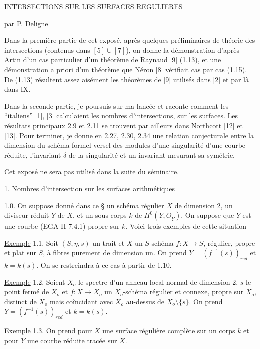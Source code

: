 


\underline{\underline{INTERSECTIONS SUR LES SURFACES REGULIERES}}


\underline{par P. Deligne}

Dans la première partie de cet exposé, après quelques préliminaires de théorie des intersections (contenus dans $[5] \cup [7]$), on donne la démonstration d'après Artin d'un cas particulier d'un théorème de Raynaud [9] (1.13), et une démonstration a priori d'un théorème que Néron [8] vérifiait cas par cas (1.15). De (1.13) résultent assez aisément les théorèmes de [9] utilisés dans [2] et par là dans IX.

Dans la seconde partie, je poursuis sur ma lancée et raconte comment les ``italiens'' [1], [3] calculaient les nombres d'intersections, sur les surfaces. Les résultats principaux 2.9 et 2.11 se trouvent par ailleurs dans Northcott [12] et [13]. Pour terminer, je donne en 2.27, 2.30, 2.34 une relation conjecturale entre la dimension du schéma formel versel des modules d'une singularité d'une courbe réduite, l'invariant $\delta$ de la singularité et un invariant mesurant sa symétrie.

Cet exposé ne sera pas utilisé dans la suite du séminaire.


1. \underline{Nombres d'intersection sur les surfaces arithmétiques}

1.0. On suppose donné dans ce \S{} un schéma régulier $X$ de dimension 2, un diviseur réduit $Y$ de $X$, et un sous-corps $k$ de $H^0(Y,\underline{O}_Y)$. On suppose que $Y$ est une courbe (EGA II 7.4.1) propre sur $k$. Voici trois exemples de cette situation

\underline{Exemple} 1.1. Soit $(S,\eta,s)$ un trait et $X$ un $S$-schéma $f : X \longrightarrow S$, régulier, propre et plat sur $S$, à fibres purement de dimension un. On prend $Y = (f^{-1}(s))_{red}$ et $k = k(s)$. On se restreindra à ce cas à partir de 1.10.



\underline{Exemple} 1.2. Soient $X_o$ le spectre d'un anneau local normal de dimension 2, $s$ le point fermé de $X_o$ et $f : X \longrightarrow X_o$ un $X_o$-schéma régulier et connexe, propre sur $X_o$, distinct de $X_o$ mais coîncidant avec $X_o$ au-dessus de $X_o \setminus \{s\}$. On prend $Y = (f^{-1}(s))_{red}$ et $k = k(s)$.

\underline{Exemple} 1.3. On prend pour $X$ une surface régulière complète sur un corps $k$ et pour $Y$ une courbe réduite tracée sur $X$.

